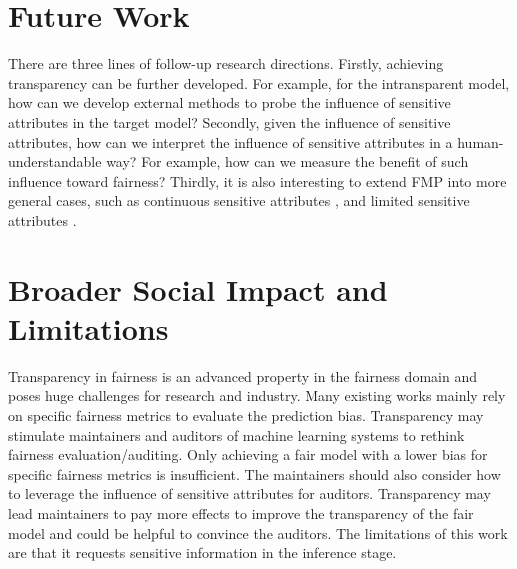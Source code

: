 \documentclass[letterpaper]{article} %
\theoremstyle{plain}
\theoremstyle{definition}
\theoremstyle{remark}
\begin{document}
\section{Future Work}
There are three lines of follow-up research directions. Firstly, achieving transparency can be further developed. For example, for the intransparent model, how can we develop external methods to probe the influence of sensitive attributes in the target model? Secondly, given the influence of sensitive attributes, how can we interpret the influence of sensitive attributes in a human-understandable way? For example, how can we measure the benefit of such influence toward fairness? Thirdly, it is also interesting to extend FMP into more general cases, such as continuous sensitive attributes \citep{jiang2022generalized}, and limited sensitive attributes \citep{dai2021say}.

\section{Broader Social Impact and Limitations}\label{app:impact}
Transparency in fairness is an advanced property in the fairness domain and poses huge challenges for research and industry. Many existing works mainly rely on specific fairness metrics to evaluate the prediction bias. Transparency may stimulate maintainers and auditors of machine learning systems to rethink fairness evaluation/auditing. Only achieving a fair model with a lower bias for specific fairness metrics is insufficient. The maintainers should also consider how to leverage the influence of sensitive attributes for auditors. Transparency may lead maintainers to pay more effects to improve the transparency of the fair model and could be helpful to convince the auditors. The limitations of this work are that it requests sensitive information in the inference stage.
\end{document}
